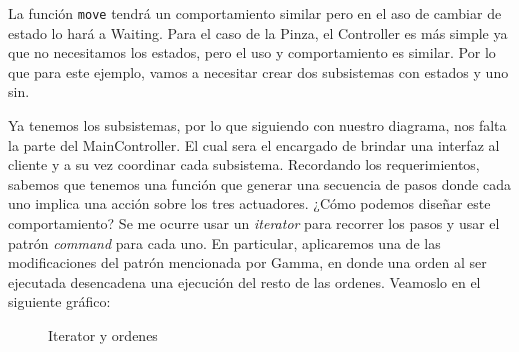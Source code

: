La función \verb|move| tendrá un comportamiento similar pero en el aso de cambiar de estado lo hará a Waiting. Para el caso de la Pinza, el Controller es más simple ya que no necesitamos los estados, pero el uso y comportamiento es similar. Por lo que para este ejemplo, vamos a necesitar crear dos subsistemas con estados y uno sin.

Ya tenemos los subsistemas, por lo que siguiendo con nuestro diagrama, nos falta la parte del MainController. El cual sera el encargado de brindar una interfaz al cliente y a su vez coordinar cada subsistema. Recordando los requerimientos, sabemos que tenemos una función que generar una secuencia de pasos donde cada uno implica una acción sobre los tres actuadores. ¿Cómo podemos diseñar este comportamiento? Se me ocurre usar un \textit{iterator} para recorrer los pasos y usar el patrón \textit{command} para cada uno. En particular, aplicaremos una de las modificaciones del patrón mencionada por Gamma, en donde una orden al ser ejecutada desencadena una ejecución del resto de las ordenes. Veamoslo en el siguiente gráfico:


\begin{figure}[h]
\caption{Iterator y ordenes}
\begin{center}
\end{center}
\end{figure}

